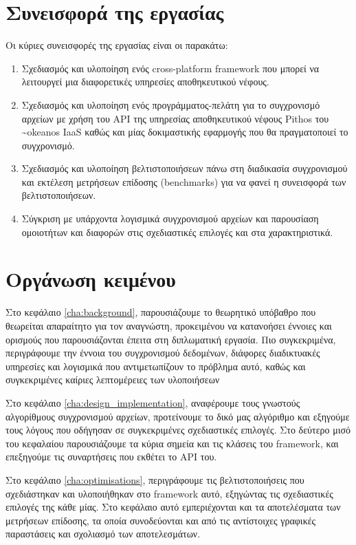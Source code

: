 \section{Συνεισφορά της εργασίας}
  Οι κύριες συνεισφορές της εργασίας είναι οι παρακάτω:
    \begin{enumerate}
    \item Σχεδιασμός και υλοποίηση ενός cross-platform framework που μπορεί να λειτουργεί μια διαφορετικές υπηρεσίες αποθηκευτικού νέφους.
    \item Σχεδιασμός και υλοποίηση ενός προγράμματος-πελάτη για το συγχρονισμό αρχείων με χρήση του API της υπηρεσίας αποθηκευτικού νέφους Pithos του \textasciitilde okeanos IaaS καθώς και μίας δοκιμαστικής εφαρμογής που θα πραγματοποιεί το συγχρονισμό.
    \item Σχεδιασμός και υλοποίηση βελτιστοποιήσεων πάνω στη διαδικασία συγχρονισμού και εκτέλεση μετρήσεων επίδοσης (benchmarks) για να φανεί η συνεισφορά των βελτιστοποιήσεων.
    \item Σύγκριση με υπάρχοντα λογισμικά συγχρονισμού αρχείων και παρουσίαση ομοιοτήτων και διαφορών στις σχεδιαστικές επιλογές και στα χαρακτηριστικά.
  \end{enumerate}

\section{Οργάνωση κειμένου}
  Στο κεφάλαιο \ref{cha:background}, παρουσιάζουμε το θεωρητικό υπόβαθρο που θεωρείται απαραίτητο για τον αναγνώστη, προκειμένου να κατανοήσει έννοιες και ορισμούς που παρουσιάζονται έπειτα στη διπλωματική εργασία. Πιο συγκεκριμένα, περιγράφουμε την έννοια του συγχρονισμού δεδομένων, διάφορες διαδικτυακές υπηρεσίες και λογισμικά που αντιμετωπίζουν το πρόβλημα αυτό, καθώς και συγκεκριμένες καίριες λεπτομέρειες των υλοποιήσεων

  Στο κεφάλαιο \ref{cha:design_implementation}, αναφέρουμε τους γνωστούς αλγορίθμους συγχρονισμού αρχείων, προτείνουμε το δικό μας αλγόριθμο και εξηγούμε τους λόγους που οδήγησαν σε συγκεκριμένες σχεδιαστικές επιλογές. Στο δεύτερο μισό του κεφαλαίου παρουσιάζουμε τα κύρια σημεία και τις κλάσεις του framework, και επεξηγούμε τις συναρτήσεις που εκθέτει το API του.

  Στο κεφάλαιο \ref{cha:optimisations}, περιγράφουμε τις βελτιστοποιήσεις που σχεδιάστηκαν και υλοποιήθηκαν στο framework αυτό, εξηγώντας τις σχεδιαστικές επιλογές της κάθε μίας. Στο κεφάλαιο αυτό εμπεριέχονται και τα αποτελέσματα των μετρήσεων επίδοσης, τα οποία συνοδεύονται και από τις αντίστοιχες γραφικές παραστάσεις και σχολιασμό των αποτελεσμάτων.

